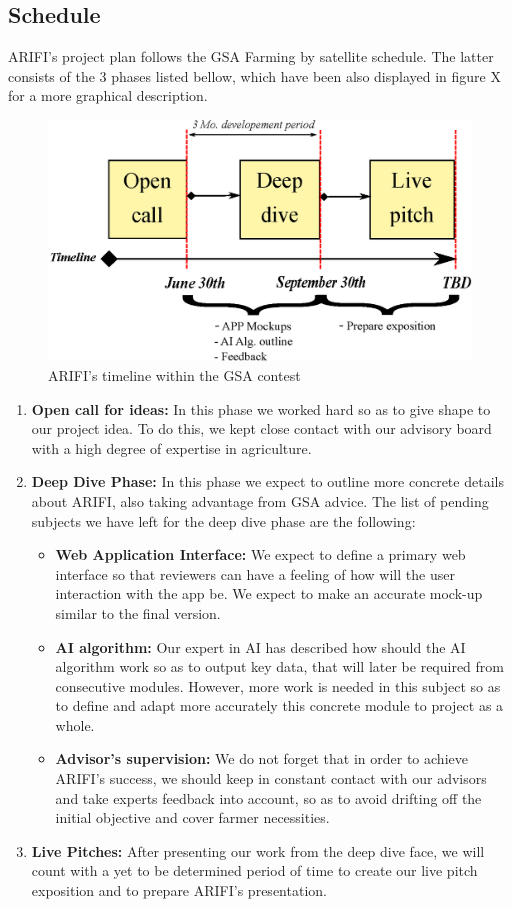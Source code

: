 \subsection{Schedule}
ARIFI's project plan follows the GSA Farming by satellite schedule. The latter consists of the 3 phases listed bellow, which have been also displayed in figure X for a more graphical description.
\begin{figure}[b!]
\centering
\includegraphics[scale= 0.7]{images/schedule.eps}
\caption{ARIFI's timeline within the GSA contest}
\label{fig:sch2}
\end{figure}
\begin{enumerate}
    \item \textbf{Open call for ideas:} In this phase we worked hard so as to give shape to our project idea. To do this, we kept close contact with our advisory board with a high degree of expertise in agriculture. 
    \item \textbf{Deep Dive Phase:} In this phase we expect to outline more concrete details about ARIFI, also taking advantage from GSA advice. The list of pending subjects we have left for the deep dive phase are the following:
    \begin{itemize}
        \item \textbf{Web Application Interface:} We expect to define a primary web interface so that reviewers can have a feeling of how will the user interaction with the app be. We expect to make an accurate mock-up similar to the final version.
        \item \textbf{AI algorithm:} Our expert in AI has described how should the AI algorithm work so as to output key data, that will later be required from consecutive modules. However, more work is needed in this subject so as to define and adapt more accurately this concrete module to project as a whole.
        \item \textbf{Advisor's supervision:} We do not forget that in order to achieve ARIFI's success, we should keep in constant contact with our advisors and take experts feedback into account, so as to avoid drifting off the initial objective and cover farmer necessities.
    \end{itemize}
    \item \textbf{Live Pitches:} After presenting our work from the deep dive face, we will count with a yet to be determined period of time to create our live pitch exposition and to prepare ARIFI's presentation.\\
\end{enumerate}



